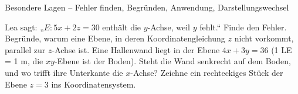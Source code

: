\begin{aufgabe}{Besondere Lagen – Fehler finden, Begründen, Anwendung, Darstellungswechsel}
\begin{teile}
\teil Lea sagt: „$E\colon 5x + 2z = 30$ enthält die $y$-Achse, weil $y$ fehlt.“ Finde den Fehler.
\teil Begründe, warum eine Ebene, in deren Koordinatengleichung $z$ nicht vorkommt, parallel zur $z$-Achse ist.
\teil Eine Hallenwand liegt in der Ebene $4x + 3y = 36$ (1 LE = 1 m, die $xy$-Ebene ist der Boden). Steht die Wand senkrecht auf dem Boden, und wo trifft ihre Unterkante die $x$-Achse?
\teil Zeichne ein rechteckiges Stück der Ebene $z = 3$ ins Koordinatensystem.

\begin{ksys3}[xyz]\end{ksys3}
\end{teile}
\end{aufgabe}

